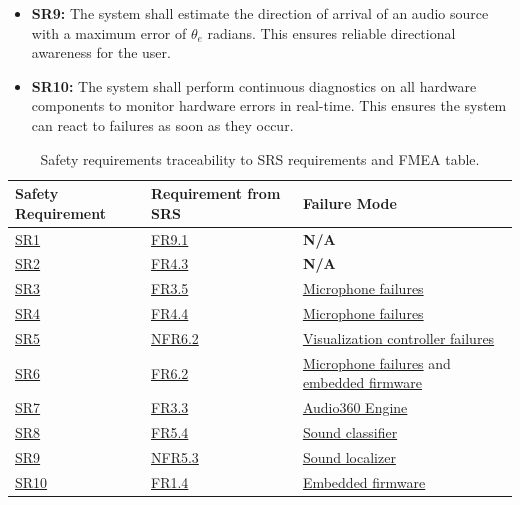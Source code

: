 \documentclass{article}
\begin{document}
\begin{itemize}
    \item \label{SR9}\textbf{SR9:} The system shall estimate the
    direction of arrival of an audio source with a maximum error of
    \hyperref[SRS-symbol:theta_e]{$\theta_e$} radians.
    This ensures reliable directional awareness for the user.

    \item \label{SR10}\textbf{SR10:} The system shall perform continuous
    diagnostics on all hardware components to monitor hardware errors in
    real-time. This ensures the system can react to failures as soon as they
    occur.
    
\end{itemize}

\begin{table}[h!]
\centering

\begin{tabular}{lll}
\toprule
\textbf{Safety Requirement} & \textbf{Requirement from SRS} & \textbf{Failure Mode}\\
\midrule
\hyperref[SR1]{SR1} & \hyperref[SRS-FR9_1]{FR9.1} & \textbf{N/A}\\
\hyperref[SR2]{SR2} & \hyperref[SRS-NFR4_3]{FR4.3} & \textbf{N/A}\\
\hyperref[SR3]{SR3} & \hyperref[SRS-FR3_5]{FR3.5} & \hyperref[fmea:microphone]{Microphone failures}\\
\hyperref[SR4]{SR4} & \hyperref[SRS-FR4_4]{FR4.4} & \hyperref[fmea:microphone]{Microphone failures}\\
\hyperref[SR5]{SR5} & \hyperref[SRS-NFR6_2]{NFR6.2} & \hyperref[fmea:visualization_controller]{Visualization controller failures}\\
\hyperref[SR6]{SR6} & \hyperref[SRS-FR6_2]{FR6.2} & \hyperref[fmea:microphone]{Microphone failures} and \hyperref[fmea:embedded_firmware]{embedded firmware}\\
\hyperref[SR7]{SR7} & \hyperref[SRS-NFR3_3]{FR3.3} & \hyperref[fmea:sound_classifier]{Audio360 Engine} \\
\hyperref[SR8]{SR8} & \hyperref[SRS-FR5_4]{FR5.4} & \hyperref[fmea:sound_classifier]{Sound classifier}\\
\hyperref[SR9]{SR9} & \hyperref[SRS-NFR5_3]{NFR5.3} & \hyperref[fmea:sound_localizer]{Sound localizer}\\
\hyperref[SR10]{SR10} & \hyperref[SRS-FR1_4]{FR1.4} & \hyperref[fmea:embedded_firmware]{Embedded firmware}\\
\bottomrule
\end{tabular}
\caption{Safety requirements traceability to SRS requirements and FMEA table.}
\end{table}
\end{document}
